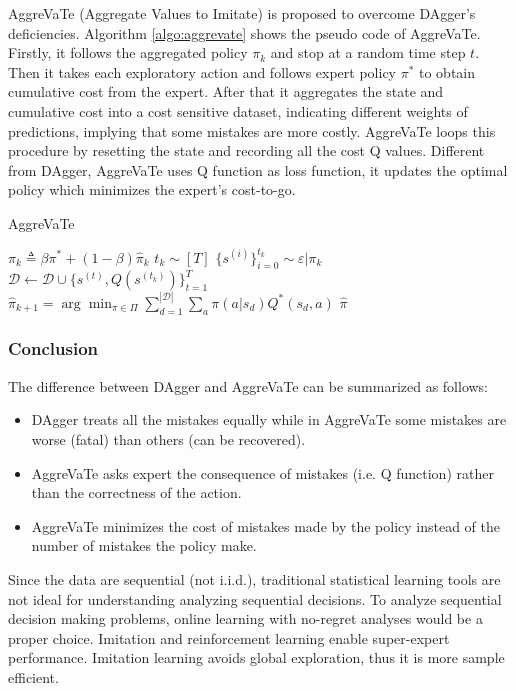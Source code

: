 \documentclass[11pt]{article}
\begin{document}
AggreVaTe (Aggregate Values to Imitate) \cite{ross2014reinforcement} is proposed to overcome DAgger's deficiencies. Algorithm \ref{algo:aggrevate} shows the pseudo code of AggreVaTe. Firstly, it follows the aggregated policy $\pi_k$ and stop at a random time step $t$. Then it takes each exploratory action and follows expert policy $\pi^*$ to obtain cumulative cost from the expert. After that it aggregates the state and cumulative cost into a cost sensitive dataset, indicating different weights of predictions, implying that some mistakes are more costly. AggreVaTe loops this procedure by resetting the state and recording all the cost Q values. Different from DAgger, AggreVaTe uses Q function as loss function, it updates the optimal policy which minimizes the expert's cost-to-go.

\begin{algorithm}[H]
\caption{AggreVaTe}
\label{algo:aggrevate}
\begin{algorithmic}[1]
\STATE $\pi_k \triangleq \beta\pi^* + (1-\beta)\hat{\pi}_k$
\STATE $t_k\sim[T]$
\STATE $\{s^{(i)}\}_{i=0}^{t_k}\sim\varepsilon|\pi_k$
\STATE $\mathcal{D}\leftarrow\mathcal{D}\cup\{s^{(t)},Q(s^{(t_k)})\}_{t=1}^T$
\STATE $\hat{\pi}_{k+1}=\arg\min_{\pi\in\Pi}\sum_{d=1}^{|\mathcal{D}|}\sum_a\pi(a|s_d)Q^*(s_d,a)$
\ENDFOR
\RETURN $\hat{\pi}$
\end{algorithmic}
\end{algorithm}

\subsubsection{Conclusion}
The difference between DAgger and AggreVaTe can be summarized as follows:
\begin{itemize}
    \item DAgger treats all the mistakes equally while in AggreVaTe some mistakes are worse (fatal) than others (can be recovered).
    \item AggreVaTe asks expert the consequence of mistakes (i.e. Q function) rather than the correctness of the action.
    \item AggreVaTe minimizes the cost of mistakes made by the policy instead of the number of mistakes the policy make.
\end{itemize}

Since the data are sequential (not i.i.d.), traditional statistical learning tools are not ideal for understanding analyzing sequential decisions. To analyze sequential decision making problems, online learning with no-regret analyses would be a proper choice. Imitation and reinforcement learning enable super-expert performance. Imitation learning avoids global exploration, thus it is more sample efficient.
\end{document}
